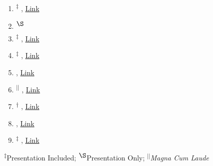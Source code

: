 \normalsize
{}
\begin{enumerate}[leftmargin=0.5cm]
	\item \textsuperscript{$\ddagger$}  , 
		\href{https://laws.lanl.gov/vhosts/mcnp.lanl.gov/pdf_files/la-ur-17-20353.pdf}{Link}   \label{ans_summer2017_paper} \vspace{4mm}
	\item \textsuperscript{$\S$}  \label{ans_summer2017_jrt_paper} \vspace{4mm}

	\item \textsuperscript{$\ddagger$}  , 
		\href{https://app.box.com/s/kbe3jlwsq0qxcyrirneqpodl3mqoz3n3}{Link}   \label{caari_2016_paper_1} \vspace{4mm}
	\item \textsuperscript{$\ddagger$}  , 
		\href{https://app.box.com/s/sqx0ddl77lg0vue0ahffhdr9pclmlybi}{Link}   \label{caari_2016_paper_2} \vspace{4mm}
	\item  {}, 
		\href{https://app.box.com/s/raujd5ok40d45qaeq3lx2r6akdv8xfqx}{Link} \label{ans_winter2016_paper} \vspace{4mm}
	\item \textsuperscript{$||$}   , 
		\href{http://cds.ismrm.org/protected/16MPresentations/abstracts/1108.html}{Link}      \label{ismrm_2016_paper} \vspace{4mm}
	\item \textsuperscript{$\dagger$} , 
		\href{https://app.box.com/s/yc0aft4oafsgg6f6qhzjpvbgouql0lle}{Link}     \label{cmrr_2015_paper} \vspace{4mm}
        \item {}, 
		\href{https://app.box.com/s/bj7sbfqana8sixv70nu6afa5i5mfuamt}{Link}  \label{ismrm_2014_paper} \vspace{4mm}
	\item \textsuperscript{$\ddagger$}  , 
		\href{https://app.box.com/s/rqnshtxi4umq1lm2m5g7fcd16m1ztap0}{Link}  \label{abaqus_2012_paper} \vspace{3mm}
\end{enumerate}

\vspace{-3mm}
\footnotesize
\begin{center}
\textsuperscript{$\ddagger$}Presentation Included; \textsuperscript{$\S$}Presentation Only; \textsuperscript{$||$}\textit{Magna Cum Laude}
\end{center}
